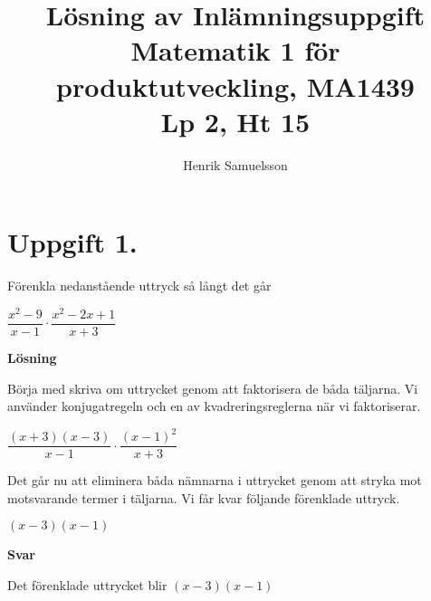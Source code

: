 \documentclass{article}
\begin{document}
\begin{titlepage}
\title{Lösning av Inlämningsuppgift \\ Matematik 1 för produktutveckling, MA1439 \\ Lp 2, Ht 15}
\author{Henrik Samuelsson}
\maketitle
\thispagestyle{empty}
\end{titlepage}

\section*{Uppgift 1.}
Förenkla nedanstående uttryck så långt det går

$\dfrac{x^2 - 9}{x - 1} \cdot \dfrac{x^2 - 2x + 1}{x + 3}$

\textbf{Lösning}

Börja med skriva om uttrycket genom att  faktorisera de båda täljarna. Vi använder konjugatregeln och en av kvadreringsreglerna när vi faktoriserar.

$\dfrac{(x + 3)(x-3)}{x - 1} \cdot \dfrac{(x-1)^2}{x + 3}$

Det går nu att eliminera båda nämnarna i uttrycket genom att stryka mot motsvarande termer i täljarna. Vi får kvar följande förenklade uttryck. 

$(x-3)(x-1)$

\textbf{Svar}

Det förenklade uttrycket blir $(x-3)(x-1)$
\end{document}
